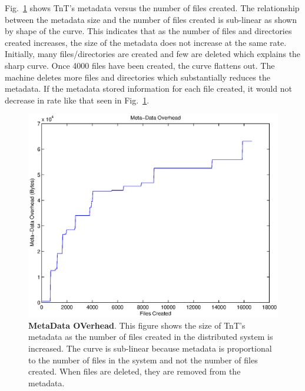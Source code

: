 Fig.~\ref{fig:metadata} shows TnT's metadata versus the number of files created.  The relationship between the metadata size and the number of files created is sub-linear as shown by shape of the curve.  This indicates that as the number of files and directories created increases, the size of the metadata does not increase at the same rate.  Initially, many files/directories are created and few are deleted which explains the sharp curve.  Once 4000 files have been created, the curve flattens out.  The machine deletes more files and directories which substantially reduces the metadata.  If the metadata stored information for each file created, it would not decrease in rate like that seen in Fig.~\ref{fig:metadata}.  

\begin{figure}[t]
\centering
\includegraphics[width=4.5in]{metadata.eps}
\caption{{\bf MetaData OVerhead}.  This figure shows the size of TnT's metadata as the number of files created in the distributed system is increased.  The curve is sub-linear because metadata is proportional to the number of files in the system and not the number of files created.  When files are deleted, they are removed from the metadata.}
\label{fig:metadata}
\end{figure}

